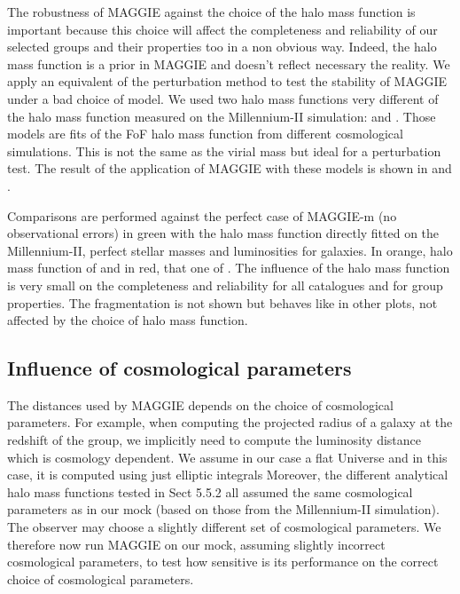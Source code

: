 The robustness of MAGGIE against the choice of the halo mass function is
important because this choice will affect the completeness and reliability of
our selected groups and their properties too in a non obvious way. Indeed, the
halo mass function is a prior in MAGGIE and doesn't reflect necessary the
reality. We apply an equivalent of the perturbation method to test the
stability of MAGGIE under a bad choice of model. We used two halo mass
functions very different of the halo mass function measured on the
Millennium-II simulation: \citet{Warren+06} and \citet{Courtin+11}. Those
models are fits of the FoF halo mass function from different cosmological
simulations. This is not the same as the virial mass but ideal for a
perturbation test. The result of the application of MAGGIE with these models is
shown in  and .

Comparisons are performed against the perfect case of MAGGIE-m (no
observational errors) in green with the halo mass function directly fitted on
the Millennium-II, perfect stellar masses and luminosities for galaxies. In
orange, halo mass function of \citet{Warren+06} and in red, that one of
\citet{Courtin+11}. The influence of the halo mass function is very small on
the completeness and reliability for all catalogues and for group properties.
The fragmentation is not shown but behaves like in other plots, not affected by
the choice of halo mass function.

\subsection{Influence of cosmological parameters}

The distances used by MAGGIE depends on the choice of cosmological parameters.
For example, when computing the projected radius of a galaxy at the redshift of
the group, we implicitly need to compute the luminosity distance which is
cosmology dependent. We assume in our case a flat Universe and in this case, it
is computed using just elliptic integrals \citep{Liu+11,Eisenstein+97}
Moreover, the different analytical halo mass functions tested in Sect 5.5.2 all
assumed the same cosmological parameters as in our mock (based on those from
the Millennium-II simulation). The observer may choose a slightly different set
of cosmological parameters. We therefore now run MAGGIE on our mock, assuming
slightly incorrect cosmological parameters, to test how sensitive is its
performance on the correct choice of cosmological parameters.

